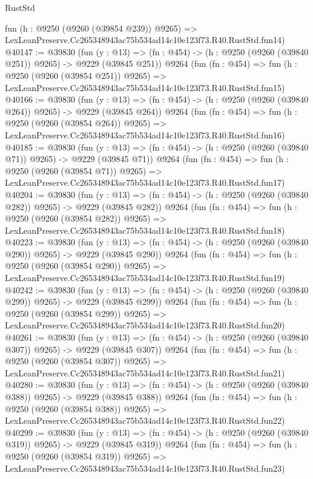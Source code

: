 \begin{lexlean}{RustStd}
\begin{coremodule}
    fun (h : @9250 (@9260 (@39854 @239)) @9265) =>
    LexLeanPreserve.Cc265348943ac75b534ad14c10e123f73.R40.RustStd.fun14)
@40147 := @39830
    (fun (y : @13) => (fn : @454) -> (h : @9250 (@9260 (@39840 @251)) @9265) -> @9229 (@39845 @251))
    @9264
    (fun (fn : @454) =>
    fun (h : @9250 (@9260 (@39854 @251)) @9265) =>
    LexLeanPreserve.Cc265348943ac75b534ad14c10e123f73.R40.RustStd.fun15)
@40166 := @39830
    (fun (y : @13) => (fn : @454) -> (h : @9250 (@9260 (@39840 @264)) @9265) -> @9229 (@39845 @264))
    @9264
    (fun (fn : @454) =>
    fun (h : @9250 (@9260 (@39854 @264)) @9265) =>
    LexLeanPreserve.Cc265348943ac75b534ad14c10e123f73.R40.RustStd.fun16)
@40185 := @39830
    (fun (y : @13) => (fn : @454) -> (h : @9250 (@9260 (@39840 @71)) @9265) -> @9229 (@39845 @71))
    @9264
    (fun (fn : @454) =>
    fun (h : @9250 (@9260 (@39854 @71)) @9265) =>
    LexLeanPreserve.Cc265348943ac75b534ad14c10e123f73.R40.RustStd.fun17)
@40204 := @39830
    (fun (y : @13) => (fn : @454) -> (h : @9250 (@9260 (@39840 @282)) @9265) -> @9229 (@39845 @282))
    @9264
    (fun (fn : @454) =>
    fun (h : @9250 (@9260 (@39854 @282)) @9265) =>
    LexLeanPreserve.Cc265348943ac75b534ad14c10e123f73.R40.RustStd.fun18)
@40223 := @39830
    (fun (y : @13) => (fn : @454) -> (h : @9250 (@9260 (@39840 @290)) @9265) -> @9229 (@39845 @290))
    @9264
    (fun (fn : @454) =>
    fun (h : @9250 (@9260 (@39854 @290)) @9265) =>
    LexLeanPreserve.Cc265348943ac75b534ad14c10e123f73.R40.RustStd.fun19)
@40242 := @39830
    (fun (y : @13) => (fn : @454) -> (h : @9250 (@9260 (@39840 @299)) @9265) -> @9229 (@39845 @299))
    @9264
    (fun (fn : @454) =>
    fun (h : @9250 (@9260 (@39854 @299)) @9265) =>
    LexLeanPreserve.Cc265348943ac75b534ad14c10e123f73.R40.RustStd.fun20)
@40261 := @39830
    (fun (y : @13) => (fn : @454) -> (h : @9250 (@9260 (@39840 @307)) @9265) -> @9229 (@39845 @307))
    @9264
    (fun (fn : @454) =>
    fun (h : @9250 (@9260 (@39854 @307)) @9265) =>
    LexLeanPreserve.Cc265348943ac75b534ad14c10e123f73.R40.RustStd.fun21)
@40280 := @39830
    (fun (y : @13) => (fn : @454) -> (h : @9250 (@9260 (@39840 @388)) @9265) -> @9229 (@39845 @388))
    @9264
    (fun (fn : @454) =>
    fun (h : @9250 (@9260 (@39854 @388)) @9265) =>
    LexLeanPreserve.Cc265348943ac75b534ad14c10e123f73.R40.RustStd.fun22)
@40299 := @39830
    (fun (y : @13) => (fn : @454) -> (h : @9250 (@9260 (@39840 @319)) @9265) -> @9229 (@39845 @319))
    @9264
    (fun (fn : @454) =>
    fun (h : @9250 (@9260 (@39854 @319)) @9265) =>
    LexLeanPreserve.Cc265348943ac75b534ad14c10e123f73.R40.RustStd.fun23)

\end{coremodule}
\end{lexlean}
